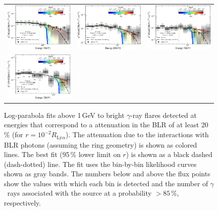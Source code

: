 \documentclass[twocolumn,linenumbers]{aastex62}
\newcommand{\Grays}{$\gamma$~rays\xspace}
\newcommand{\gray}{$\gamma$-ray\xspace}
\begin{document}
\begin{figure}
\begin{tabular}{ccc}
    \includegraphics[width=0.32\linewidth]{figures/sed_CTA102_t002_LogParabola_3min_ring_emin1000.pdf} & 
    \includegraphics[width=0.32\linewidth]{figures/sed_CTA102_t003_LogParabola_3min_ring_emin1000.pdf} & 
    \includegraphics[width=0.32\linewidth]{figures/sed_CTA102_t004_LogParabola_3min_ring_emin1000.pdf}\\
    \includegraphics[width=0.32\linewidth]{figures/sed_CTA102_t001_LogParabola_3min_ring_emin1000.pdf}
    \end{tabular}

    \caption{Log-parabola fits above 1\,GeV to bright \gray flares detected at energies that correspond to a attenuation in the BLR of at least 20\,\% (for $r = 10^{-2}R_{\mathrm{Ly}\alpha}$). The attenuation due to the interactions with BLR photons (assuming the ring geometry) is shown as colored lines. The best fit (95\,\% lower limit on $r$) is shown as a black dashed (dash-dotted) line. 
    The fit uses the bin-by-bin likelihood curves shown as gray bands. The numbers below and above the flux points show the  values  with which each bin is detected and the number of \Grays associated with the source at a probability $>85\,\%$, respectively.}
    \label{fig:seds}
\end{figure}
\end{document}
